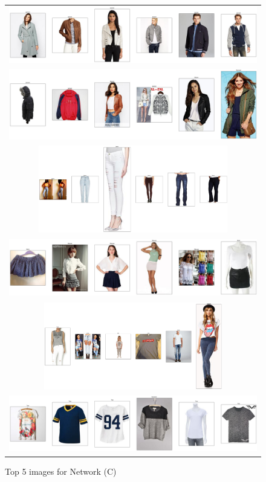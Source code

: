 \documentclass{article}
\begin{document}
\begin{figure}
\begin{tabular}{c}
{\includegraphics[width = 5in]{c/search_idx_3012.png}}\\
{\includegraphics[width = 5in]{c/search_idx_3013.png}}\\
{\includegraphics[width = 5in, height = 1.5in]{c/search_idx_4002.png}}\\
{\includegraphics[width = 5in, height = 1in]{c/search_idx_7513.png}}\\
{\includegraphics[width = 5in, height = 1.5in]{c/search_idx_8716.png}}\\
{\includegraphics[width = 5in]{c/search_idx_9388.png}}
\end{tabular}
\caption{Top 5 images for Network (C)}
\label{fig:img_netC}
\end{figure}
\end{document}
